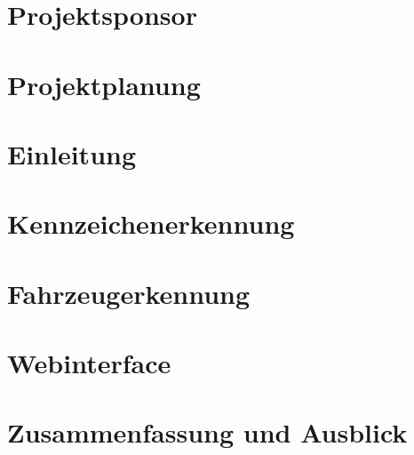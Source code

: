 \documentclass[hidelinks,12pt,a4paper,twoside]{article}
\begin{document}
\section{Projektsponsor}

\pagebreak




\section{Projektplanung}

\pagebreak




\section{Einleitung}

\pagebreak


%


\section{Kennzeichenerkennung}

\pagebreak


\section{Fahrzeugerkennung}

\pagebreak


\section{Webinterface}

\pagebreak

\def \sectionauthors {Philipp Kraft, Dennis Köb und Samuel Bleiner}


\section{Zusammenfassung und Ausblick}

\pagebreak
\end{document}
